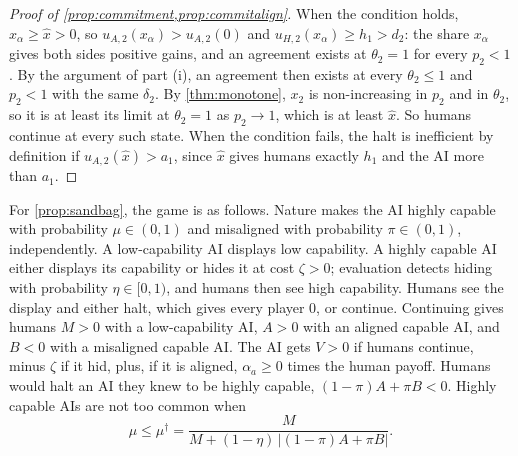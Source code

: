 \documentclass[article, 11pt, reqno]{amsart}
\theoremstyle{named}
\theoremstyle{plain}
\begin{document}
\begin{proof}[Proof of \cref{prop:commitment,prop:commitalign}]
When the condition holds, $x_\alpha \ge \hat x > 0$, so $u_{A,2}(x_\alpha) > u_{A,2}(0)$ and $u_{H,2}(x_\alpha) \ge h_1 > d_2$: the share $x_\alpha$ gives both sides positive gains, and an agreement exists at $\theta_2 = 1$ for every $p_2 < 1$. By the argument of part (i), an agreement then exists at every $\theta_2 \le 1$ and $p_2 < 1$ with the same $\delta_2$. By \cref{thm:monotone}, $x_2$ is non-increasing in $p_2$ and in $\theta_2$, so it is at least its limit at $\theta_2 = 1$ as $p_2 \to 1$, which is at least $\hat x$. So humans continue at every such state. When the condition fails, the halt is inefficient by definition if $u_{A,2}(\hat x) > a_1$, since $\hat x$ gives humans exactly $h_1$ and the AI more than $a_1$.
\end{proof}

For \cref{prop:sandbag}, the game is as follows. Nature makes the AI highly capable with probability $\mu \in (0,1)$ and misaligned with probability $\pi \in (0,1)$, independently. A low-capability AI displays low capability. A highly capable AI either displays its capability or hides it at cost $\zeta > 0$; evaluation detects hiding with probability $\eta \in [0,1)$, and humans then see high capability. Humans see the display and either halt, which gives every player $0$, or continue. Continuing gives humans $M > 0$ with a low-capability AI, $A > 0$ with an aligned capable AI, and $B < 0$ with a misaligned capable AI. The AI gets $V > 0$ if humans continue, minus $\zeta$ if it hid, plus, if it is aligned, $\alpha_a \ge 0$ times the human payoff. Humans would halt an AI they knew to be highly capable, $(1-\pi)A + \pi B < 0$. Highly capable AIs are not too common when
\[
\mu \le \mu^\dagger = \frac{M}{M + (1-\eta)\,\lvert (1-\pi)A + \pi B \rvert}.
\]
\end{document}
